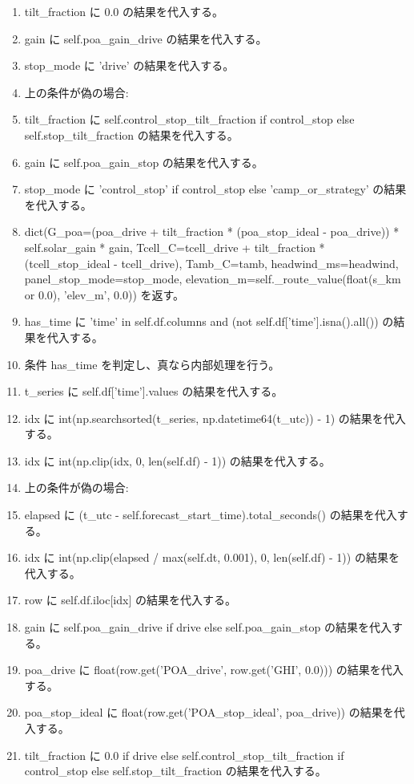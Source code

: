 \documentclass[a4paper,11pt]{article}
\begin{document}
\begin{enumerate}[leftmargin=1.8em]
\item     tilt\_fraction に 0.0 の結果を代入する。
\item     gain に self.poa\_gain\_drive の結果を代入する。
\item     stop\_mode に 'drive' の結果を代入する。
\item     上の条件が偽の場合:
\item     tilt\_fraction に self.control\_stop\_tilt\_fraction if control\_stop else self.stop\_tilt\_fraction の結果を代入する。
\item     gain に self.poa\_gain\_stop の結果を代入する。
\item     stop\_mode に 'control\_stop' if control\_stop else 'camp\_or\_strategy' の結果を代入する。
\item   dict(G\_poa=(poa\_drive + tilt\_fraction * (poa\_stop\_ideal - poa\_drive)) * self.solar\_gain * gain, Tcell\_C=tcell\_drive + tilt\_fraction * (tcell\_stop\_ideal - tcell\_drive), Tamb\_C=tamb, headwind\_ms=headwind, panel\_stop\_mode=stop\_mode, elevation\_m=self.\_route\_value(float(s\_km or 0.0), 'elev\_m', 0.0)) を返す。
\item has\_time に 'time' in self.df.columns and (not self.df['time'].isna().all()) の結果を代入する。
\item 条件 has\_time を判定し、真なら内部処理を行う。
\item   t\_series に self.df['time'].values の結果を代入する。
\item   idx に int(np.searchsorted(t\_series, np.datetime64(t\_utc)) - 1) の結果を代入する。
\item   idx に int(np.clip(idx, 0, len(self.df) - 1)) の結果を代入する。
\item   上の条件が偽の場合:
\item   elapsed に (t\_utc - self.forecast\_start\_time).total\_seconds() の結果を代入する。
\item   idx に int(np.clip(elapsed / max(self.dt, 0.001), 0, len(self.df) - 1)) の結果を代入する。
\item row に self.df.iloc[idx] の結果を代入する。
\item gain に self.poa\_gain\_drive if drive else self.poa\_gain\_stop の結果を代入する。
\item poa\_drive に float(row.get('POA\_drive', row.get('GHI', 0.0))) の結果を代入する。
\item poa\_stop\_ideal に float(row.get('POA\_stop\_ideal', poa\_drive)) の結果を代入する。
\item tilt\_fraction に 0.0 if drive else self.control\_stop\_tilt\_fraction if control\_stop else self.stop\_tilt\_fraction の結果を代入する。

\end{enumerate}
\end{document}
